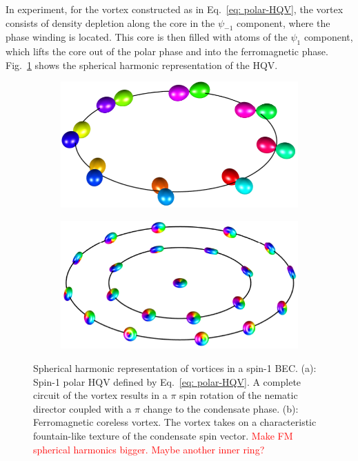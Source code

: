 In experiment, for the vortex constructed as in Eq.~\eqref{eq: polar-HQV}, the
vortex consists of density depletion along the core in the \(\psi_{-1}\)
component, where the phase winding is located.
This core is then filled with atoms of the \(\psi_1 \) component, which lifts
the core out of the polar phase and into the ferromagnetic phase.
Fig.~\ref{subfig: polar-HQV} shows the spherical harmonic representation of the
HQV.\@
\begin{figure}
    \centering
    \begin{subfigure}{0.49\textwidth}
        \includegraphics[width=\textwidth]
        {gfx/ch-groundStateSymmetries/polar-HQV.pdf}
        \caption{\label{subfig: polar-HQV}}
    \end{subfigure}
    \begin{subfigure}{0.49\textwidth}
        \includegraphics[width=\textwidth]
        {gfx/ch-groundStateSymmetries/coreless.pdf}
        \caption{\label{subfig: coreless-vortex}}
    \end{subfigure}
    \caption[Spherical harmonic representation of spin-1 vortices]
    {Spherical harmonic representation of vortices in a spin-1 BEC.\@
        (a): Spin-1 polar HQV defined by Eq.~\eqref{eq: polar-HQV}.
        A complete circuit of the vortex results in a \(\pi \) spin rotation of
        the nematic director coupled with a \(\pi \) change to the condensate
        phase.
        (b): Ferromagnetic coreless vortex.
        The vortex takes on a characteristic fountain-like texture of the
        condensate spin vector. \textcolor{red}{Make FM spherical harmonics
            bigger. Maybe another inner ring?}
    }
\end{figure}

